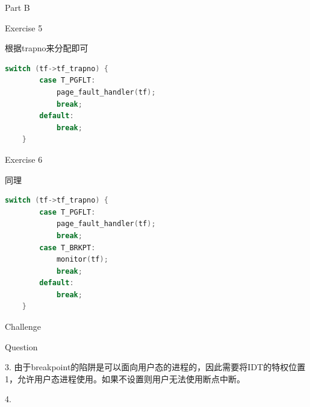 \documentclass[GBK,winfonts,a4paper,10pt]{ctexart}
\begin{document}
\begin{section}{ Part B }
\begin{subsection}{ Exercise 5 }
\par
根据trapno来分配即可
\begin{lstlisting}[language=C]
    switch (tf->tf_trapno) {
        case T_PGFLT:
            page_fault_handler(tf);
            break;
        default:
            break;
    }
\end{lstlisting}
\end{subsection}

\begin{subsection}{ Exercise 6 }
\par
同理
\begin{lstlisting}[language=C]
    switch (tf->tf_trapno) {
        case T_PGFLT:
            page_fault_handler(tf);
            break;
        case T_BRKPT:
            monitor(tf); 
            break;
        default:
            break;
    }
\end{lstlisting}
\end{subsection}

\begin{subsection}{ Challenge }
\end{subsection}

\begin{subsection}{ Question }
\par
3. 由于breakpoint的陷阱是可以面向用户态的进程的，因此需要将IDT的特权位置1，允许用户态进程使用。如果不设置则用户无法使用断点中断。
\par
4. 
\end{subsection}


\end{section}
\end{document}
